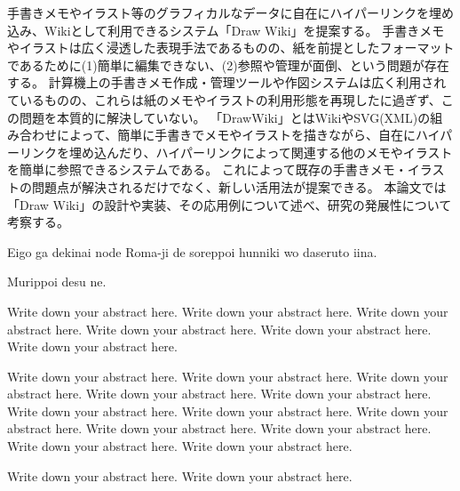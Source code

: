 


\begin{jabstract}

手書きメモやイラスト等のグラフィカルなデータに自在にハイパーリンクを埋め込み、Wikiとして利用できるシステム「Draw Wiki」を提案する。
手書きメモやイラストは広く浸透した表現手法であるものの、紙を前提としたフォーマットであるために(1)簡単に編集できない、(2)参照や管理が面倒、という問題が存在する。
計算機上の手書きメモ作成・管理ツールや作図システムは広く利用されているものの、これらは紙のメモやイラストの利用形態を再現したに過ぎず、この問題を本質的に解決していない。
「DrawWiki」とはWikiやSVG(XML)の組み合わせによって、簡単に手書きでメモやイラストを描きながら、自在にハイパーリンクを埋め込んだり、ハイパーリンクによって関連する他のメモやイラストを簡単に参照できるシステムである。
これによって既存の手書きメモ・イラストの問題点が解決されるだけでなく、新しい活用法が提案できる。
本論文では「Draw Wiki」の設計や実装、その応用例について述べ、研究の発展性について考察する。

\end{jabstract}


\begin{eabstract}

Eigo ga dekinai node Roma-ji de soreppoi hunniki wo daseruto iina.

Murippoi desu ne.

Write down your abstract here. Write down your abstract here. Write down your abstract here. Write down your abstract here. Write down your abstract here. Write down your abstract here.

 Write down your abstract here. Write down your abstract here. Write down your abstract here. Write down your abstract here. Write down your abstract here. Write down your abstract here. Write down your abstract here. Write down your abstract here. Write down your abstract here. Write down your abstract here. Write down your abstract here. Write down your abstract here.

Write down your abstract here. Write down your abstract here.

\end{eabstract}
